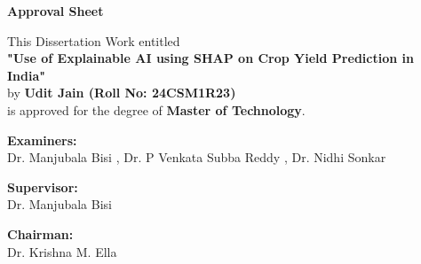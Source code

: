 \documentclass[a4paper,11pt,oneside]{book}
\begin{document}
\newpage


\begin{center}
    {\Huge \textbf{Approval Sheet}}
\end{center}
\vspace{1em}

\begin{center}
\vspace{1em}
This Dissertation Work entitled \\[0.5cm]
\textbf{"Use of Explainable AI using SHAP on Crop Yield Prediction in India"} \\[0.5cm]
by \textbf{Udit Jain (Roll No: 24CSM1R23)} \\[0.5cm]
is approved for the degree of \textbf{Master of Technology}.
\end{center}

\vspace{1cm}

\begin{center}
\textbf{Examiners:} \\ [0.5cm]
Dr. Manjubala Bisi , Dr. P Venkata Subba Reddy , Dr. Nidhi Sonkar \\
\end{center}

\vspace{0.5cm}

\begin{center}
\textbf{Supervisor:} \\[0.5cm]
Dr. Manjubala Bisi \\
\end{center}

\vspace{0.5cm}

\begin{center}
\textbf{Chairman:} \\[0.5cm]
Dr. Krishna M. Ella \\
\end{center}

\vspace{0.5cm}
\end{document}
